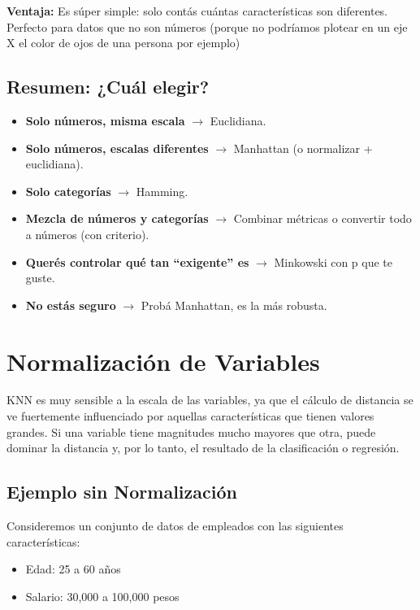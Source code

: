 \documentclass[12pt]{article}
\begin{document}
\textbf{Ventaja:} Es súper simple: solo contás cuántas características son diferentes. Perfecto para datos que no son números (porque no podríamos plotear en un eje X el color de ojos de una persona por ejemplo)

\subsection{Resumen: ¿Cuál elegir?}

\begin{itemize}
    \item \textbf{Solo números, misma escala} $\rightarrow$ Euclidiana.
    \item \textbf{Solo números, escalas diferentes} $\rightarrow$ Manhattan (o normalizar + euclidiana).
    \item \textbf{Solo categorías} $\rightarrow$ Hamming.
    \item \textbf{Mezcla de números y categorías} $\rightarrow$ Combinar métricas o convertir todo a números (con criterio).
    \item \textbf{Querés controlar qué tan ``exigente'' es} $\rightarrow$ Minkowski con p que te guste.
    \item \textbf{No estás seguro} $\rightarrow$ Probá Manhattan, es la más robusta.
\end{itemize}

\section{Normalización de Variables}

KNN es muy sensible a la escala de las variables, ya que el cálculo de distancia se ve fuertemente influenciado por aquellas características que tienen valores grandes. Si una variable tiene magnitudes mucho mayores que otra, puede dominar la distancia y, por lo tanto, el resultado de la clasificación o regresión.

\subsection{Ejemplo sin Normalización}

Consideremos un conjunto de datos de empleados con las siguientes características:
\begin{itemize}
    \item Edad: 25 a 60 años
    \item Salario: 30,000 a 100,000 pesos
\end{itemize}
\end{document}
